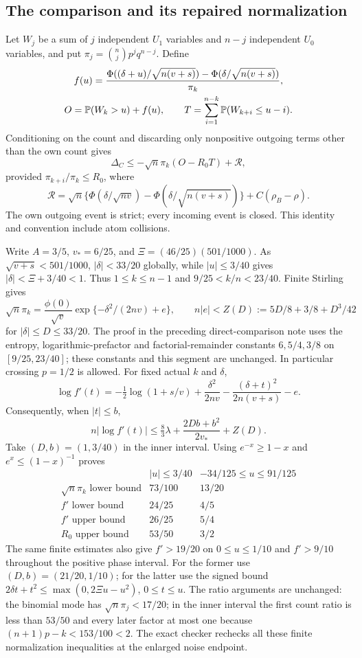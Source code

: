\subsection{The comparison and its repaired normalization}
Let $W_j$ be a sum of $j$ independent $U_1$ variables and $n-j$
independent $U_0$ variables, and put $\pi_j=\binom njp^jq^{n-j}$.
Define
\[
 \begin{gathered}
 f(u)=\frac{\Phi((\delta+u)/\sqrt{n(v+s)})-
                 \Phi(\delta/\sqrt{n(v+s)})}{\pi_k},\\
 O=\mathbb P(W_k>u)+f(u),\qquad
 T=\sum_{i=1}^{n-k}\mathbb P(W_{k+i}\le u-i).
 \end{gathered}
\]
Conditioning on the count and discarding only nonpositive outgoing terms
other than the own count gives
\begin{equation}\label{v11:counts:master}
 \Delta_C\le-\sqrt n\pi_k(O-R_0T)+\mathcal R,
\end{equation}
provided $\pi_{k+i}/\pi_k\le R_0$, where
\[
 \mathcal R=\sqrt n\{\Phi(\delta/\sqrt{nv})-
                \Phi(\delta/\sqrt{n(v+s)})\}+C(\rho_B-\rho).
\]
The own outgoing event is strict; every incoming event is closed.
This identity and convention include atom collisions.

Write $A=3/5$, $v_*=6/25$, and
$\Xi=(46/25)(501/1000)$. As $\sqrt{v+s}<501/1000$,
$|\delta|<33/20$ globally, while $|u|\le3/40$ gives
$|\delta|<\Xi+3/40<1$. Thus $1\le k\le n-1$ and
$9/25<k/n<23/40$. Finite Stirling gives
\[
 \sqrt n\pi_k=\frac{\phi(0)}{\sqrt v}
       \exp\{-\delta^2/(2nv)+e\},\qquad
 n|e|<Z(D):=5D/8+3/8+D^3/42
\]
for $|\delta|\le D\le33/20$.
The proof in the preceding direct-comparison note uses the entropy,
logarithmic-prefactor and factorial-remainder constants $6,5/4,3/8$
on $[9/25,23/40]$; these
constants and this segment are unchanged. In particular crossing
$p=1/2$ is allowed.
For fixed actual $k$ and $\delta$,
\[
 \log f'(t)=-\tfrac12\log(1+s/v)+\frac{\delta^2}{2nv}
             -\frac{(\delta+t)^2}{2n(v+s)}-e.
\]
Consequently, when $|t|\le b$,
\[
 n|\log f'(t)|\le\tfrac83\lambda+
                 \frac{2Db+b^2}{2v_*}+Z(D).
\]
Take $(D,b)=(1,3/40)$ in the inner interval. Using
$e^{-x}\ge1-x$ and $e^x\le(1-x)^{-1}$ proves
\[
\begin{array}{c|cc}
 & |u|\le3/40&-34/125\le u\le91/125\\\hline
 \sqrt n\pi_k\text{ lower bound}&73/100&13/20\\
 f'\text{ lower bound}&24/25&4/5\\
 f'\text{ upper bound}&26/25&5/4\\
 R_0\text{ upper bound}&53/50&3/2
\end{array}
\]
The same finite estimates also give $f'>19/20$ on $0\le u\le1/10$
and $f'>9/10$ throughout the positive phase interval. For the former
use $(D,b)=(21/20,1/10)$; for the latter use the signed bound
$2\delta t+t^2\le\max(0,2\Xi u-u^2)$, $0\le t\le u$.
The ratio arguments are unchanged: the binomial mode has
$\sqrt n\pi_j<17/20$; in the inner interval the first count ratio is
less than $53/50$ and every later factor at most one because
$(n+1)p-k<153/100<2$. The exact checker rechecks all these finite
normalization inequalities at the enlarged noise endpoint.

